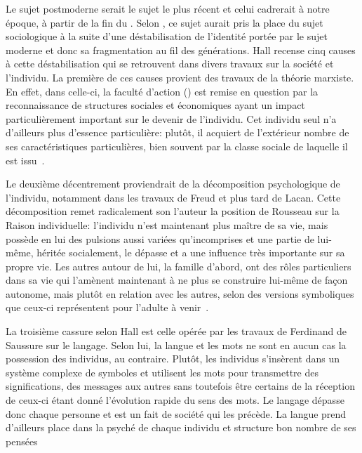 Le sujet postmoderne serait le sujet le plus récent et celui cadrerait à notre époque, à partir de la fin du . 
Selon \citeauthor{Hall1996a}, ce sujet aurait pris la place du sujet sociologique à la suite d'une déstabilisation de l'identité portée par le sujet moderne et donc sa fragmentation au fil des générations. 
Hall recense cinq causes à cette déstabilisation qui se retrouvent dans divers travaux sur la société et l'individu. 
La première de ces causes provient des travaux de la théorie marxiste. 
En effet, dans celle-ci, la faculté d'action () est remise en question par la reconnaissance de structures sociales et économiques ayant un impact particulièrement important sur le devenir de l'individu. 
Cet individu seul n'a d'ailleurs plus d'essence particulière: plutôt, il acquiert de l'extérieur nombre de ses caractéristiques particulières, bien souvent par la classe sociale de laquelle il est issu~\citeyearpar[606]{Hall1996a}.

Le deuxième décentrement proviendrait de la décomposition psychologique de l'individu, notamment dans les travaux de Freud et plus tard de Lacan. 
Cette décomposition remet radicalement son l'auteur la position de Rousseau sur la Raison individuelle: l'individu n'est maintenant plus maître de sa vie, mais possède en lui des pulsions aussi variées qu'incomprises et une partie de lui-même, héritée socialement, le dépasse et a une influence très importante sur sa propre vie. 
Les autres autour de lui, la famille d'abord, ont des rôles particuliers dans sa vie qui l'amènent maintenant à ne plus se construire lui-même de façon autonome, mais plutôt en relation avec les autres, selon des versions symboliques que ceux-ci représentent pour l'adulte à venir~\citeyearpar[ 607--608]{Hall1996a}.

La troisième cassure selon Hall est celle opérée par les travaux de Ferdinand de Saussure sur le langage. 
Selon lui, la langue et les mots ne sont en aucun cas la possession des individus, au contraire. 
Plutôt, les individus s'insèrent dans un système complexe de symboles et utilisent les mots pour transmettre des significations, des messages aux autres sans toutefois être certains de la réception de ceux-ci étant donné l'évolution rapide du sens des mots. 
Le langage dépasse donc chaque personne et est un fait de société qui les précède. 
La langue prend d'ailleurs place dans la psyché de chaque individu et structure bon nombre de ses pensées~\citeyearpar[608--609]{Hall1996a}

